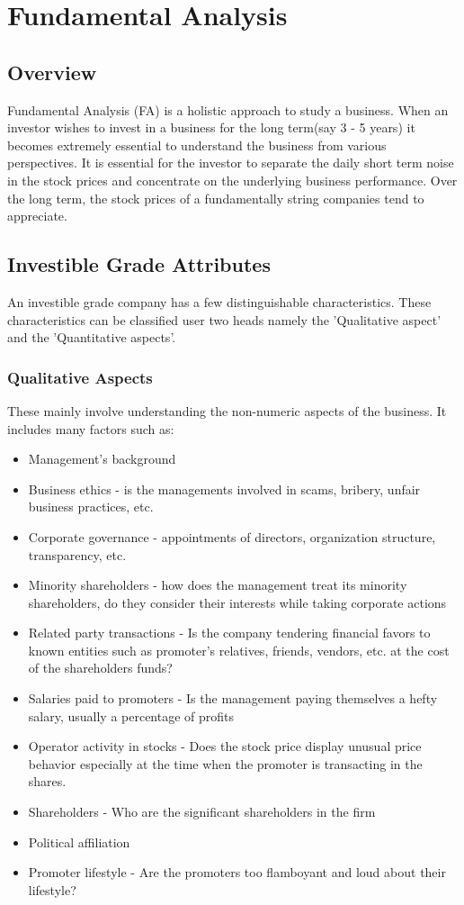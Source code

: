 \chapter{Fundamental Analysis}

\section{Overview}

Fundamental Analysis (FA) is a holistic approach to study a business. When an investor wishes to invest in a business for the long term(say 3 - 5 years) it becomes extremely essential to understand the business from various perspectives. It is essential for the investor to separate the daily short term noise in the stock prices and concentrate on the underlying business performance. Over the long term, the stock prices of a fundamentally string companies tend to appreciate.

\section{Investible Grade Attributes}
An investible grade company has a few distinguishable characteristics. These characteristics can be classified user two heads namely the 'Qualitative aspect' and the 'Quantitative aspects'.

\subsection{Qualitative Aspects}
These mainly involve understanding the non-numeric aspects of the business. It includes many factors such as:
\begin{itemize}
  \item Management's background
  \item Business ethics - is the managements involved in scams, bribery, unfair business practices, etc.
  \item Corporate governance - appointments of directors, organization structure, transparency, etc.
  \item Minority shareholders - how does the management treat its minority shareholders, do they consider their interests while taking corporate actions
  \item Related party transactions - Is the company tendering financial favors to known entities such as promoter's relatives, friends, vendors, etc. at the cost of the shareholders funds?
  \item Salaries paid to promoters - Is the management paying themselves a hefty salary, usually a percentage of profits
  \item Operator activity in stocks - Does the stock price display unusual price behavior especially at the time when the promoter is transacting in the shares.
  \item Shareholders - Who are the significant shareholders in the firm
  \item Political affiliation
  \item Promoter lifestyle - Are the promoters too flamboyant and loud about their lifestyle?
\end{itemize}

